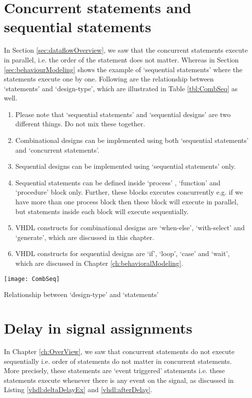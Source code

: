 \section{Concurrent statements and sequential statements}\label{sec:concurrentSeq}

In Section \ref{sec:dataflowOverview}, we saw that the concurrent statements execute in parallel, i.e. the order of the statement does not matter. Whereas in Section \ref{sec:behaviourModeling} shows the example of `sequential statements' where the statements execute one by one. Following are the relationship between `statements' and `design-type', which are illustrated in Table \ref{tbl:CombSeq} as well. 

\begin{enumerate}
	\item Please note that `sequential statements' and `sequential designs' are two different things. Do not mix these together.
	\item Combinational designs can be implemented using both `sequential statements' and `concurrent statements'. 
	\item Sequential designs can be implemented using `sequential statements' only. 
	\item Sequential statements can be defined inside `process' , `function' and `procedure' block only. Further, these blocks executes concurrently e.g. if we have more than one process block then these block will execute in parallel, but statements inside each block will execute sequentially. 
	\item VHDL constructs for combinational designs are `when-else', `with-select' and `generate', which are discussed in this chapter. 
	\item VHDL constructs for sequential designs are `if', `loop', `case' and `wait', which are discussed in Chapter \ref{ch:behavioralModeling}.
\end{enumerate}

\begin{table}[!h]
	\centering
	\texttt{[image: CombSeq]}
	\caption{Relationship between `design-type' and `statements'}
	\label{tbl:CombSeq}
\end{table}

\section{Delay in signal assignments}
In Chapter \ref{ch:OverView}, we saw that concurrent statements do not execute sequentially i.e. order of statements do not matter in concurrent statements. More precisely, these statements are `event triggered' statements i.e. these statements execute whenever there is any event on the signal, as discussed in Listing \ref{vhdl:deltaDelayEx} and \ref{vhdl:afterDelay}.


